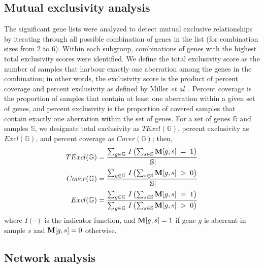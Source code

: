 \subsection{Mutual exclusivity analysis}

The significant gene lists were analyzed to detect mutual exclusive relationships by iterating through all possible combination of genes in the list (for combination sizes from 2 to 6). Within each subgroup, combinations of genes with the highest total exclusivity scores were identified. We define the total exclusivity score as the number of samples that harbour exactly one aberration among the genes in the combination; in other words, the exclusivity score is the product of percent coverage and percent exclusivity as defined by Miller \emph{et al}\ . Percent coverage is the proportion of samples that contain at least one aberration within a given set of genes, and percent exclusivity is the proportion of covered samples that contain exactly one aberration within the set of genes. For a set of genes $\mathbb{G}$ and samples $\mathbb{S}$, we designate total exclusivity as $TExcl(\mathbb{G})$, percent exclusivity as $Excl(\mathbb{G})$, and percent coverage as $Cover(\mathbb{G})$; then,
\begin{align*}
TExcl(\mathbb{G}) &= \frac
{\sum_{g \in \mathbb{G}} \, I \left( \sum_{s \in \mathbb{S}} \mathbf{M}[g, s] \; = \; 1 \right) }
{|\mathbb{S}|}\\
Cover(\mathbb{G}) &= \frac
{\sum_{g \in \mathbb{G}} \, I \left( \sum_{s \in \mathbb{S}} \mathbf{M}[g, s] \; > \; 0 \right) }
{|\mathbb{S}|}\\
Excl(\mathbb{G}) &= \frac
{\sum_{g \in \mathbb{G}} \, I \left( \sum_{s \in \mathbb{S}} \mathbf{M}[g, s] \; = \; 1 \right) }
{\sum_{g \in \mathbb{G}} \, I \left( \sum_{s \in \mathbb{S}} \mathbf{M}[g, s] \; > \; 0 \right) }
\end{align*}
where $I(\cdot)$ is the indicator function, and $\mathbf{M}[g, s] = 1$ if gene $g$ is aberrant in sample $s$ and $\mathbf{M}[g, s] = 0$ otherwise.

\subsection{Network analysis}

